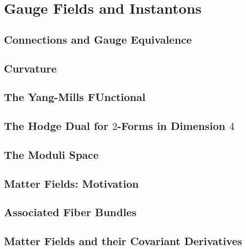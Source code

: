 \chapter{Gauge Fields and Instantons}

\section{Connections and Gauge Equivalence}

\section{Curvature}

\section{The Yang-Mills FUnctional}

\section{The Hodge Dual for $2$-Forms in Dimension $4$}

\section{The Moduli Space}

\section{Matter Fields: Motivation}

\section{Associated Fiber Bundles}

\section{Matter Fields and their Covariant Derivatives}